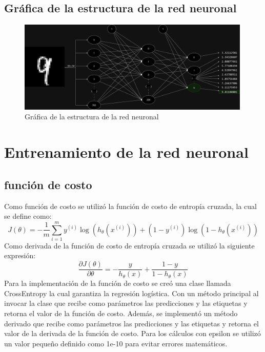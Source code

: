 \documentclass{article}
\begin{document}
    \subsection{Gráfica de la estructura de la red neuronal}\label{subsec:grafica-de-la-estructura-de-la-red-neuronal}
    \begin{figure}[h]
        \centering
        \includegraphics[width=0.99\textwidth]{img/red}
        \caption{Gráfica de la estructura de la red neuronal}
        \label{fig:red_neuronal}
    \end{figure}

    \section{Entrenamiento de la red neuronal}\label{sec:entrenamiento-de-la-red-neuronal}

    \subsection{función de costo}\label{subsec:funcion-de-costo}

    Como función de costo se utilizó la función de costo de entropía cruzada, la cual se define como:
    \begin{equation}
        J(\theta) = -\frac{1}{m} \sum_{i=1}^{m} y^{(i)} \log(h_{\theta}(x^{(i)})) + (1 - y^{(i)}) \log(1 - h_{\theta}(x^{(i)}))\label{eq:equation}
    \end{equation}
    Como derivada de la función de costo de entropía cruzada se utilizó la siguiente expresión:
    \begin{equation}
        \frac{\partial J(\theta)}{\partial \theta} = -\frac{y}{h_{\theta}(x)} + \frac{1 - y}{1 - h_{\theta}(x)}\label{eq:equation2}
    \end{equation}
    Para la implementación de la función de costo se creó una clase llamada CrossEntropy la cual garantiza la regresión logística.
    Con un método principal al invocar la clase que recibe como parámetros las predicciones y las etiquetas y retorna el valor de la función de costo.
    Además, se implementó un método derivado que recibe como parámetros las predicciones y las etiquetas y retorna el valor de la derivada de la función de costo.
    Para los cálculos con epsilon se utilizó un valor pequeño definido como 1e-10 para evitar errores matemáticos.
\end{document}
